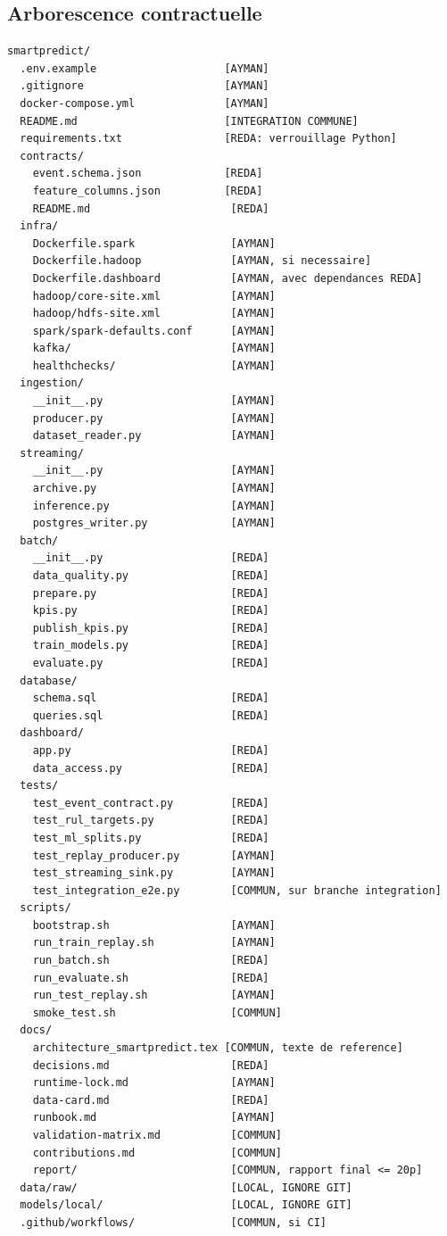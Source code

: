 \documentclass[10pt,a4paper]{article}
\begin{document}
\subsection{Arborescence contractuelle}
\begin{lstlisting}
smartpredict/
  .env.example                    [AYMAN]
  .gitignore                      [AYMAN]
  docker-compose.yml              [AYMAN]
  README.md                       [INTEGRATION COMMUNE]
  requirements.txt                [REDA: verrouillage Python]
  contracts/
    event.schema.json             [REDA]
    feature_columns.json          [REDA]
    README.md                      [REDA]
  infra/
    Dockerfile.spark               [AYMAN]
    Dockerfile.hadoop              [AYMAN, si necessaire]
    Dockerfile.dashboard           [AYMAN, avec dependances REDA]
    hadoop/core-site.xml           [AYMAN]
    hadoop/hdfs-site.xml           [AYMAN]
    spark/spark-defaults.conf      [AYMAN]
    kafka/                         [AYMAN]
    healthchecks/                  [AYMAN]
  ingestion/
    __init__.py                    [AYMAN]
    producer.py                    [AYMAN]
    dataset_reader.py              [AYMAN]
  streaming/
    __init__.py                    [AYMAN]
    archive.py                     [AYMAN]
    inference.py                   [AYMAN]
    postgres_writer.py             [AYMAN]
  batch/
    __init__.py                    [REDA]
    data_quality.py                [REDA]
    prepare.py                     [REDA]
    kpis.py                        [REDA]
    publish_kpis.py                [REDA]
    train_models.py                [REDA]
    evaluate.py                    [REDA]
  database/
    schema.sql                     [REDA]
    queries.sql                    [REDA]
  dashboard/
    app.py                         [REDA]
    data_access.py                 [REDA]
  tests/
    test_event_contract.py         [REDA]
    test_rul_targets.py            [REDA]
    test_ml_splits.py              [REDA]
    test_replay_producer.py        [AYMAN]
    test_streaming_sink.py         [AYMAN]
    test_integration_e2e.py        [COMMUN, sur branche integration]
  scripts/
    bootstrap.sh                   [AYMAN]
    run_train_replay.sh            [AYMAN]
    run_batch.sh                   [REDA]
    run_evaluate.sh                [REDA]
    run_test_replay.sh             [AYMAN]
    smoke_test.sh                  [COMMUN]
  docs/
    architecture_smartpredict.tex [COMMUN, texte de reference]
    decisions.md                   [REDA]
    runtime-lock.md                [AYMAN]
    data-card.md                   [REDA]
    runbook.md                     [AYMAN]
    validation-matrix.md           [COMMUN]
    contributions.md               [COMMUN]
    report/                        [COMMUN, rapport final <= 20p]
  data/raw/                        [LOCAL, IGNORE GIT]
  models/local/                    [LOCAL, IGNORE GIT]
  .github/workflows/               [COMMUN, si CI]
\end{lstlisting}
\end{document}
